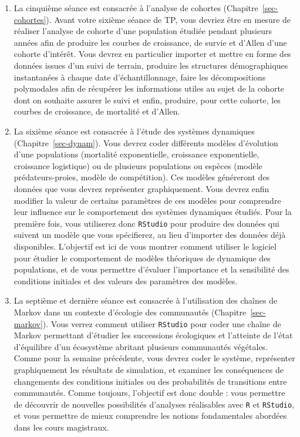 \documentclass[
  french,
  a4paper,
  DIV=11,
  numbers=noendperiod,
  oneside]{scrreprt}
\begin{document}
\begin{enumerate}
\def\labelenumi{\arabic{enumi}.}
\setcounter{enumi}{2}
\item
  La cinquième séance est consacrée à l'analyse de cohortes
  (Chapitre~\ref{sec-cohortes}). Avant votre sixième séance de TP, vous
  devriez être en mesure de réaliser l'analyse de cohorte d'une
  population étudiée pendant plusieurs années afin de produire les
  courbes de croissance, de survie et d'Allen d'une cohorte d'intérêt.
  Vous devrez en particulier importer et mettre en forme des données
  issues d'un suivi de terrain, produire les structures démographiques
  instantanées à chaque date d'échantillonnage, faire les décompositions
  polymodales afin de récupérer les informations utiles au sujet de la
  cohorte dont on souhaite assurer le suivi et enfin, produire, pour
  cette cohorte, les courbes de croissance, de mortalité et d'Allen.
\item
  La sixième séance est consacrée à l'étude des systèmes dynamiques
  (Chapitre~\ref{sec-dynam}). Vous devrez coder différents modèles
  d'évolution d'une populations (mortalité exponentielle, croissance
  exponentielle, croissance logistique) ou de plusieurs populations ou
  espèces (modèle prédateurs-proies, modèle de compétition). Ces modèles
  généreront des données que vous devrez représenter graphiquement. Vous
  devrez enfin modifier la valeur de certains paramètres de ces modèles
  pour comprendre leur influence sur le comportement des systèmes
  dynamiques étudiés. Pour la première fois, vous utiliserez donc
  \texttt{RStudio} pour produire des données qui suivent un modèle que
  vous spécifierez, au lieu d'importer des données déjà disponibles.
  L'objectif est ici de vous montrer comment utiliser le logiciel pour
  étudier le comportement de modèles théoriques de dynamique des
  populations, et de vous permettre d'évaluer l'importance et la
  sensibilité des conditions initiales et des valeurs des paramètres des
  modèles.
\item
  La septième et dernière séance est consacrée à l'utilisation des
  chaînes de Markov dans un contexte d'écologie des communautés
  (Chapitre~\ref{sec-markov}). Vous verrez comment utiliser
  \texttt{RStudio} pour coder une chaîne de Markov permettant d'étudier
  les successions écologiques et l'atteinte de l'état d'équilibre d'un
  écosystème abritant plusieurs communautés végétales. Comme pour la
  semaine précédente, vous devrez coder le système, représenter
  graphiquement les résultats de simulation, et examiner les
  conséquences de changements des conditions initiales ou des
  probabilités de transitions entre communautés. Comme toujours,
  l'objectif est donc double : vous permettre de découvrir de nouvelles
  possibilités d'analyses réalisables avec \texttt{R} et
  \texttt{RStudio}, et vous permettre de mieux comprendre les notions
  fondamentales abordées dans les cours magistraux.
\end{enumerate}
\end{document}
